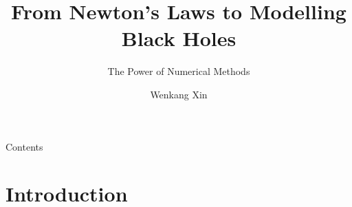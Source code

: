 \documentclass{beamer}
\title{From Newton's Laws to Modelling Black Holes}
\subtitle{The Power of Numerical Methods}
\author{Wenkang Xin}
\begin{document}
\frame{\titlepage}

\begin{frame}{Contents}
    \tableofcontents
\end{frame}


\section{Introduction}
\end{document}
